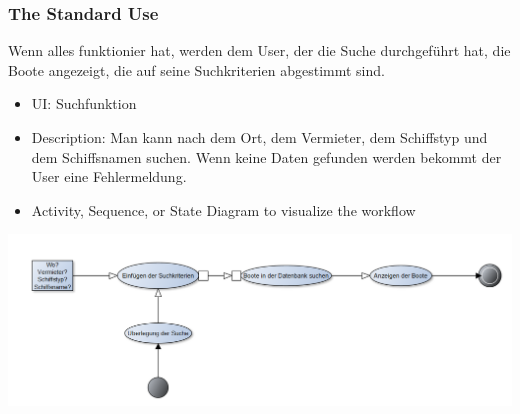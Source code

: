 \documentclass[12pt]{article}
\theoremstyle{definition}
\begin{document}
\subsubsection{The Standard Use}
Wenn alles funktionier hat, werden dem User, der die Suche durchgeführt hat, die Boote angezeigt, die auf seine Suchkriterien abgestimmt sind.
\begin{itemize}
	\item UI: Suchfunktion
	\item Description: Man kann nach dem Ort, dem Vermieter, dem Schiffstyp und dem Schiffsnamen suchen. Wenn keine Daten gefunden werden bekommt der User eine Fehlermeldung.
	\item Activity, Sequence, or State Diagram to visualize the workflow
\end{itemize}
\includegraphics[height=0.40\textwidth]{Aktivitaetsdiagramm.PNG}
\end{document}
